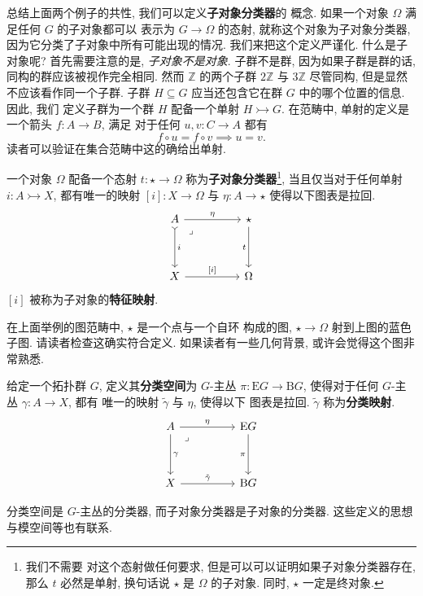 总结上面两个例子的共性, 我们可以定义\textbf{子对象分类器}的
概念. 如果一个对象 \(\Omega\) 满足任何 \(G\) 的子对象都可以
表示为 \(G \to \Omega\) 的态射, 就称这个对象为子对象分类器,
因为它分类了子对象中所有可能出现的情况.
我们来把这个定义严谨化. 什么是子对象呢? 首先需要注意的是,
\emph{子对象不是对象}. 子群不是群, 因为如果子群是群的话,
同构的群应该被视作完全相同. 然而 \(\mathbb Z\)
的两个子群 \(2\mathbb Z\) 与 \(3\mathbb Z\)
尽管同构, 但是显然不应该看作同一个子群. 子群 \(H \subseteq G\)
应当还包含它在群 \(G\) 中的哪个位置的信息. 因此, 我们
定义子群为一个群 \(H\) 配备一个单射 \(H \rightarrowtail G\).
在范畴中, 单射的定义是一个箭头 \(f : A \to B\), 满足
对于任何 \(u,v : C \to A\) 都有
\[f\circ u = f \circ v \implies u = v.\]
读者可以验证在集合范畴中这的确给出单射.

\begin{definition}
一个对象 \(\Omega\) 配备一个态射
\(t : \star \to \Omega\)
称为\textbf{子对象分类器}\footnote{我们不需要
对这个态射做任何要求, 但是可以可以证明如果子对象分类器存在,
那么 \(t\) 必然是单射, 换句话说 \(\star\) 是 \(\Omega\)
的子对象. 同时, \(\star\) 一定是终对象.}, 当且仅当对于任何单射
\(i : A \rightarrowtail X\), 都有唯一的映射
\([i] : X \to \Omega\) 与 \(\eta : A \to \star\)
使得以下图表是拉回.
\[\begin{tikzcd}
A && \star \\
\\
X && \Omega
\arrow["{[i]}", from=3-1, to=3-3]
\arrow["t"', from=1-3, to=3-3]
\arrow["i", tail, from=1-1, to=3-1]
\arrow["\eta", from=1-1, to=1-3]
\arrow["\lrcorner"{anchor=center, pos=0.125}, draw=none, from=1-1, to=3-3]
\end{tikzcd}\]
\([i]\) 被称为子对象的\textbf{特征映射}.
\end{definition}

在上面举例的图范畴中, \(\star\) 是一个点与一个自环
构成的图, \(\star \to \Omega\) 射到上图的蓝色子图.
请读者检查这确实符合定义. 如果读者有一些几何背景,
或许会觉得这个图非常熟悉.
\begin{definition}
给定一个拓扑群 \(G\), 定义其\textbf{分类空间}为
\(G\)-主丛 \(\pi : \mathrm{E}G \to \mathrm{B}G\),
使得对于任何 \(G\)-主丛 \(\gamma : A \to X\), 都有
唯一的映射 \(\tilde\gamma\) 与 \(\eta\), 使得以下
图表是拉回. \(\tilde\gamma\) 称为\textbf{分类映射}.
\[\begin{tikzcd}
A && \mathrm{E}G \\
\\
X && \mathrm{B}G
\arrow["{\tilde\gamma}", from=3-1, to=3-3]
\arrow["\pi"', from=1-3, to=3-3]
\arrow["\gamma", from=1-1, to=3-1]
\arrow["\eta", from=1-1, to=1-3]
\arrow["\lrcorner"{anchor=center, pos=0.125}, draw=none, from=1-1, to=3-3]
\end{tikzcd}\]
\end{definition}
分类空间是 \(G\)-主丛的分类器,
而子对象分类器是子对象的分类器.
这些定义的思想与模空间等也有联系.

